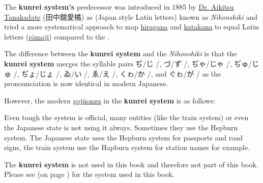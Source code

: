The \textbf{kunrei system's} predecessor was introduced in 1885 by \Link
\href{https://en.wikipedia.org/wiki/Tanakadate_Aikitsu}{Dr. Aikitsu Tanakadate}
({田中舘愛橘}) as
(Japan style Latin letters) known as \textit{Nihonshiki} and tried a more
systematical approach to map \hyperref[sec:Hiragana]{hiragana} and
\hyperref[sec:Katakana]{katakana} to equal Latin letters
(\hyperref[sec:Romaji]{rōmaji}) compared to the .

The difference between the \textbf{kunrei system} and the \textit{Nihonshiki}
is that the \textbf{kunrei system} merges the syllable pairs ぢ/じ /,
づ/ず /, ぢゃ/じゃ /, ぢゅ/じゅ /, ぢょ/じょ
/, ゐ/い /, ゑ/え /, くゎ/か /, and ぐゎ/が
/ as the pronounciation is now identical in modern Japanese.

However, the modern \hyperref[sec:Gojuonzu]{gojūonzu} in the \textbf{kunrei
system} is as follows:


Even tough the system is official, many entities (like the train system) or
even the Japanese state is not using it always. Sometimes they use the Hepburn
system. The Japanese state uses the Hepburn system for passports and road
signs, the train system use the Hapburn system for station names for example.

The \textbf{kunrei system} is not used in this book and therefore not part of
this book. Please see  (on page \pageref{sec:Hepburn}) for
the system used in this book.
